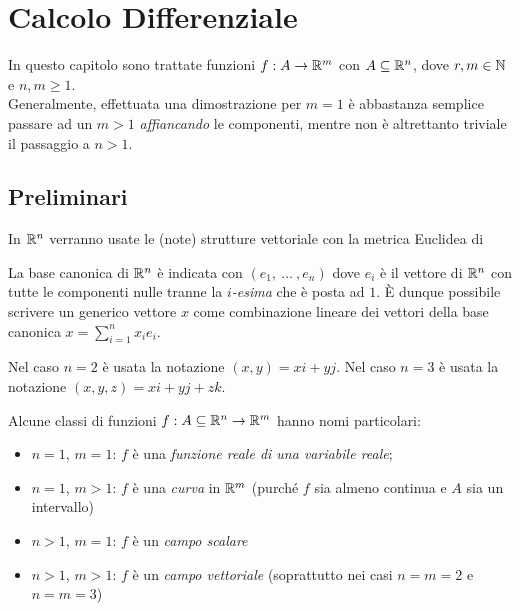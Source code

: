 \chapter{Calcolo Differenziale}

In questo capitolo sono trattate funzioni $f: A \to \mathbb{R}^m$ con $A \subseteq \mathbb{R}^n$, dove $r,m \in \mathbb{N}$ e $n,m \geq 1$.\\
Generalmente, effettuata una dimostrazione per $m = 1$ è abbastanza semplice passare ad un $m > 1$ \textit{affiancando} le componenti, mentre non è altrettanto triviale il passaggio a $n > 1$.

\section{Preliminari}
In $\mathbb{R}^n$ verranno usate le (note) strutture vettoriale con la metrica Euclidea di \hyperref[ex:dist_eucl]{} %

\vspace*{\baselineskip}
La base canonica di $\mathbb{R}^n$ è indicata con $(e_1,\:\dotsc\:,e_n)$ dove $e_i$ è il vettore di $\mathbb{R}^n$ con tutte le componenti nulle tranne la $i$\textit{-esima} che è posta ad $1$. È dunque possibile scrivere un generico vettore $x$ come combinazione lineare dei vettori della base canonica $x=\sum\limits_{i=1}^{n} x_i e_i$.

\vspace*{\baselineskip}
Nel caso $n=2$ è usata la notazione $(x,y)=xi+yj$. Nel caso $n=3$ è usata la notazione $(x,y,z)=xi+yj+zk$.

\vspace*{\baselineskip}
Alcune classi di funzioni $f:A\subseteq\mathbb{R}^n \to\mathbb{R}^m$ hanno nomi particolari:
\begin{itemize}
	\item $n=1$, $m=1$: $f$ è una \textit{funzione reale di una variabile reale};
	\item $n=1$, $m>1$: $f$ è una \textit{curva} in $\mathbb{R}^m$ (purché $f$ sia almeno continua e $A$ sia un intervallo)
	\item $n>1$, $m=1$: $f$ è un \textit{campo scalare}
	\item $n>1$, $m>1$: $f$ è un \textit{campo vettoriale} (soprattutto nei casi $n=m=2$ e $n=m=3$)
\end{itemize}

